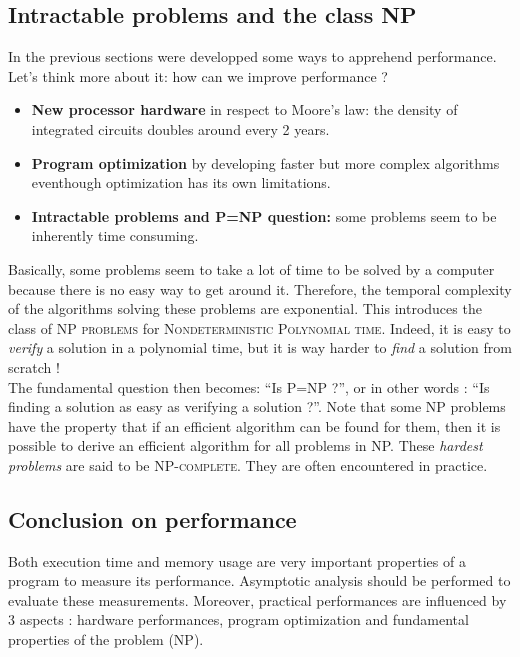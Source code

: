 \documentclass[11pt,a4paper,twoside,openright]{report}
\begin{document}
\subsection{Intractable problems and the class NP}

In the previous sections were developped some ways to apprehend performance. 
Let's think more about it: how can we improve performance ?

\begin{itemize}
  \item \textbf{New processor hardware} in respect to Moore's law: the density 
of integrated circuits doubles around every 2 years.
  \item \textbf{Program optimization} by developing faster but more complex 
algorithms eventhough optimization has its own limitations.
  \item \textbf{Intractable problems and P=NP question:} some problems seem to 
be inherently time consuming.
\end{itemize}

Basically, some problems seem to take a lot of time to be solved by a computer 
because there is no easy way to get around it. Therefore, the temporal 
complexity 
of the algorithms solving these problems are exponential. This introduces the 
class of \textsc{NP problems} for \textsc{Nondeterministic Polynomial time}. 
Indeed, it is easy to \textit{verify} a solution in a polynomial time, but it 
is 
way harder to \textit{find} a solution from scratch !\\

The fundamental question then becomes: \enquote{Is P=NP ?}, or in other words 
: \enquote{Is finding a solution as easy as verifying a solution ?}.
Note that some NP problems have the property that if an efficient algorithm can 
be found for them, then it is possible to derive an efficient algorithm for all 
problems in NP. These \textit{hardest problems} are said to be 
\textsc{NP-complete}. They are often encountered in practice.

\subsection{Conclusion on performance}

Both execution time and memory usage are very important properties of a program 
to measure its performance. Asymptotic analysis should be performed to evaluate 
these measurements. Moreover, practical performances are influenced by 3 
aspects 
: hardware performances, program optimization and fundamental properties of the 
problem (NP).
\end{document}
